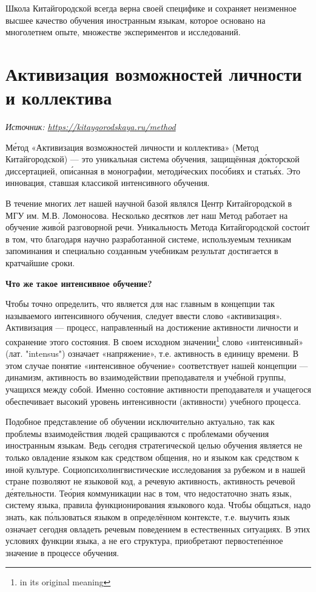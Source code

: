 Школа Китайгородской всегда верна своей специфике и сохраняет неизменное высшее качество обучения иностранным языкам, которое основано на многолетнем опыте, множестве экспериментов и исследований.

\clearpage

\section{Активизация возможностей личности и коллектива}

\textit{Источник: \url{https://kitaygorodskaya.ru/method}}

М\'{е}тод «Активизация возможностей личности и коллектива» (Метод Китайгородской) --- это уникальная система обучения, защищённая д\'{о}кторской диссертацией, оп\'{и}санная в монографии, метод\'{и}ческих пос\'{о}биях и стать\'{я}х. Это инновация, ставшая классикой интенсивного обучения.

В течение многих лет нашей научной базой являлся Центр Китайгородской в МГУ им. М.В. Ломоносова.
Несколько десятков лет наш Метод работает на обучение жив\'{о}й разговорной речи. Уникальность Метода Китайгородской состо\'{и}т в том, что благодаря научно разработанной системе, используемым техникам запоминания и специально созданным учебникам результат достигается в кратчайшие сроки.

\textbf{Что же такое интенсивное обучение?
}

Чтобы точно определить, что является для нас главным в концепции так называемого интенсивного обучения, следует ввести слово «активизация». Активизация --- процесс, направленный на достижение активности личности и сохранение этого состояния. В своем исходном значении\footnote{in its original meaning} слово «интенсивный» (лат. "intensus") означает «напряжение», т.е. активность в единицу времени. В этом случае понятие «интенсивное обучение» соответствует нашей концепции --- динамизм, активность во взаимодействии преподавателя и уч\'{е}бной группы, учащихся между собой. Именно состояние активности преподавателя и учащегося обеспечивает высокий уровень интенсивности (активности) учебного процесса.

Подобное представление об обучении исключительно актуально, так как проблемы взаимодействия людей   сращиваются с проблемами обучения иностранным языкам. Ведь сегодня стратегической целью обучения является не только овладение языком как средством общения, но и языком как средством  к иной культуре. Социопсихолингвистические исследования за рубежом и в нашей стране позволяют  не языковой код, а речевую активность, активность речевой д\'{е}ятельности. Те\'{о}рия коммуникации  нас в том, что недостаточно знать язык, систему языка, правила функционирования языкового кода. Чтобы общаться, надо знать, как п\'{о}льзоваться языком в определённом контексте, т.е. выучить язык означает сегодня овладеть речевым поведением в естественных ситуациях. В этих условиях функции языка, а не его структура, приобретают первостеп\'{е}нное значение в процессе обучения.

